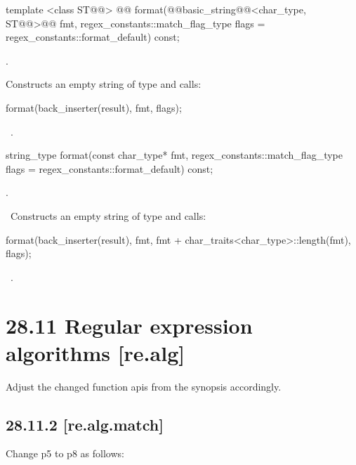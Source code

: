 \documentclass[ebook,11pt,article]{memoir}
\begin{document}
\begin{itemdecl}
template <class ST@@>
  @@
  format(@@basic_string@@<char_type, ST@@>@\del{\&}@ fmt,
         regex_constants::match_flag_type flags =
           regex_constants::format_default) const;
\end{itemdecl}

\begin{itemdescr}
\pnum
\requires {}.

\pnum
\effects
Constructs an empty string  of type  and
calls:
\begin{codeblock}
format(back_inserter(result), fmt, flags);
\end{codeblock}

\pnum
\returns\ .
\end{itemdescr}

\begin{removedblock}
\begin{itemdecl}
string_type
  format(const char_type* fmt,
         regex_constants::match_flag_type flags =
           regex_constants::format_default) const;
\end{itemdecl}

\begin{itemdescr}
\pnum
\requires {}.

\pnum
\effects\ Constructs an empty string  of type  and
calls:
\begin{codeblock}
format(back_inserter(result),
       fmt, fmt + char_traits<char_type>::length(fmt), flags);
\end{codeblock}

\pnum
\returns\ .
\end{itemdescr}
\end{removedblock}

\section{28.11 Regular expression algorithms [re.alg]}
Adjust the changed function apis from the synopsis accordingly.
\subsection{28.11.2 [re.alg.match]}
Change p5 to p8 as follows:
\end{document}
